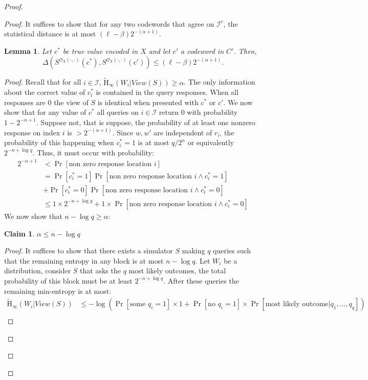 \documentclass[11pt]{article}
\newcommand{\Hav}{\tilde{\mathrm{H}}_\infty}
\newtheorem{lemma}[theorem]{Lemma}
\newtheorem{claim}[theorem]{Claim}
\begin{document}
\begin{proof}
\begin{proof}
\noindent It suffices to show that for any two codewords that agree on $\mathcal{I}^c$, the statistical distance is at most $(\ell-\beta)2^{-(\alpha+1)}$.
\begin{lemma}
\label{lem:codewords in I close}
Let $c^*$ be true value encoded in $X$ and let $c'$ a codeword in $C'$.  Then,
\[
\Delta( S^{\mathcal{O}_X(\cdot, \cdot)}(c^*), S^{\mathcal{O}_X(\cdot, \cdot)}(c')) \le ( \ell -\beta) 2^{-(\alpha+1)}.
\]
\end{lemma}
\begin{proof}
Recall that for all $i\in \mathcal{I}$, $\Hav(W_i | View(S))\geq \alpha$.  The only information about the correct value of $c_i^*$ is contained in the query responses.  When all responses are $0$ the view of $S$ is identical when presented with $c^*$ or $c'$.  We now show that for any value of $c^*$ all queries on $i \in \mathcal{I}$ return $0$ with probability $1-2^{-\alpha+1}$.  Suppose not, that is suppose, the probability of at least one nonzero response on index $i$ is $> 2^{-(\alpha+1)}$.  Since $w, w'$ are independent of $r_i$, the probability of this happening when $c^*_i = 1$ is at most $q/2^n$ or equivalently $2^{-n+\log q}$.  Thus, it must occur with probability:
\begin{align}
2^{-\alpha+1}&<\Pr[\text{non zero response location }i]\nonumber \\
 &= \Pr[c_i^* =1]\Pr[\text{non zero response location }i\wedge c_i^*=1]\nonumber \\&+ \Pr[c_i^*=0] \Pr[\text{non zero response location }i \wedge c_i^*=0]\nonumber \\
&\le 1\times 2^{-n+\log q} + 1\times  \Pr[\text{non zero response location }i \wedge c_i^*=0] \label{eq:ways to remove ent}
\end{align}
We now show that $n-\log q \geq \alpha$:
\begin{claim}
\label{cl:ent bounded away from n}
$\alpha \le n-\log q$
\end{claim}
\begin{proof}
It suffices to show that there exists a simulator $S$ making $q$ queries such that the remaining entropy in any block is at most $n-\log q$.  Let $W_i$ be a distribution, consider $S$ that asks the $q$ most likely outcomes, the total probability of this block must be at least $2^{-n+\log q}$.  After these queries the remaining min-entropy is at most:
\begin{align*}
\Hav(W_i | View(S)) &\leq  -\log \left(\Pr[\text{some }q_i=1]\times 1+ \Pr[\text{no }q_i=1]\times \Pr[\text{most likely outcome}|q_1,...,q_q]\right)\\

\end{align*}
\end{proof}
\end{proof}
\end{proof}
\end{proof}
\end{document}
